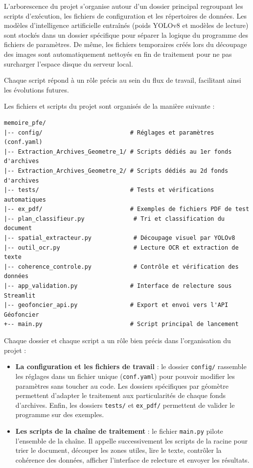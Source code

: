 L'arborescence du projet s'organise autour d'un dossier principal regroupant les scripts d'exécution, les fichiers de configuration et les répertoires de données. Les modèles d'intelligence artificielle entraînés (poids YOLOv8 et modèles de lecture) sont stockés dans un dossier spécifique pour séparer la logique du programme des fichiers de paramètres. De même, les fichiers temporaires créés lors du découpage des images sont automatiquement nettoyés en fin de traitement pour ne pas surcharger l'espace disque du serveur local.

Chaque script répond à un rôle précis au sein du flux de travail, facilitant ainsi les évolutions futures.



Les fichiers et scripts du projet sont organisés de la manière suivante :

\begin{small}
\begin{verbatim}
memoire_pfe/
|-- config/                         # Réglages et paramètres (conf.yaml)
|-- Extraction_Archives_Geometre_1/ # Scripts dédiés au 1er fonds d'archives
|-- Extraction_Archives_Geometre_2/ # Scripts dédiés au 2d fonds d'archives
|-- tests/                          # Tests et vérifications automatiques
|-- ex_pdf/                         # Exemples de fichiers PDF de test
|-- plan_classifieur.py              # Tri et classification du document
|-- spatial_extracteur.py            # Découpage visuel par YOLOv8
|-- outil_ocr.py                     # Lecture OCR et extraction de texte
|-- coherence_controle.py            # Contrôle et vérification des données
|-- app_validation.py               # Interface de relecture sous Streamlit
|-- geofoncier_api.py               # Export et envoi vers l'API Géofoncier
+-- main.py                         # Script principal de lancement
\end{verbatim}
\end{small}


Chaque dossier et chaque script a un rôle bien précis dans l'organisation du projet :

\begin{itemize}
  \item \textbf{La configuration et les fichiers de travail} : le dossier \texttt{config/} rassemble les réglages dans un fichier unique (\texttt{conf.yaml}) pour pouvoir modifier les paramètres sans toucher au code. Les dossiers spécifiques par géomètre permettent d'adapter le traitement aux particularités de chaque fonds d'archives. Enfin, les dossiers \texttt{tests/} et \texttt{ex\_pdf/} permettent de valider le programme sur des exemples.
  
  \item \textbf{Les scripts de la chaîne de traitement} : le fichier \texttt{main.py} pilote l'ensemble de la chaîne. Il appelle successivement les scripts de la racine pour trier le document, découper les zones utiles, lire le texte, contrôler la cohérence des données, afficher l'interface de relecture et envoyer les résultats.
\end{itemize}

